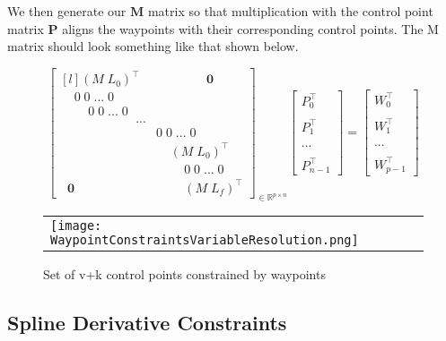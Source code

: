 \documentclass{article}
\begin{document}
We then generate our \(\textbf{M}\) matrix so that multiplication with the control point matrix \(\textbf{P}\) aligns the waypoints with their corresponding control points. The M matrix should look something like that shown below.

\begin{equation}
    \begin{bmatrix*}[l] (M \; L_0)^{\intercal} & \qquad \qquad \textbf{0} \\
    \;\; \;\; 0 \; 0 \; ... \; 0 & \\
    \;\; \;\; \;\; \;\; 0 \; 0 \; ... \; 0 & \\
    \qquad \qquad \qquad ... & \\
     & 0 \; 0 \; ... \; 0 \;\; \;\; \;\; \;\; \\
     & \;\;\;\; (M \; L_0)^{\intercal} \;\; \;\; \\
     & \;\;\;\;\;\;\;\; 0 \; 0 \; ... \; 0 \\
    \;\; \textbf{0} & \;\;\;\;\;\;\;\; (M \; L_f)^{\intercal}
    \end{bmatrix*}_{\in \mathbb{R}^{p \times n}} 
    \begin{bmatrix}
        P_0^{\intercal} \\\\ P_1^\intercal \\\\ ... \\\\ P_{n-1}^\intercal
    \end{bmatrix} = 
    \begin{bmatrix} W_0^{\intercal} \\\\ W_1^{\intercal}  \\\\ ... \\\\ W_{p-1}^{\intercal} \end{bmatrix}
\end{equation}

\begin{figure}[h]
\begin{tabular}{ll}
\texttt{[image: WaypointConstraintsVariableResolution.png]}
\end{tabular}
\caption{Set of v+k control points constrained by waypoints}
\label{Fig:WaypointConstraintsVariableResolution}
\end{figure}

\subsection{Spline Derivative Constraints}
\end{document}
